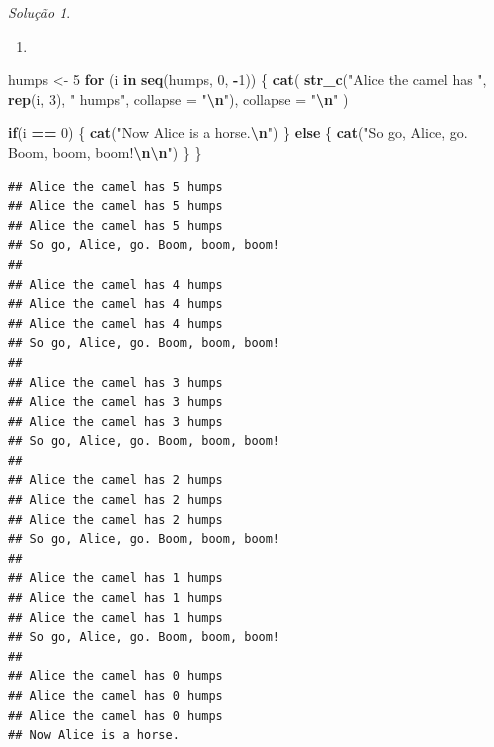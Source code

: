\documentclass[
]{latex/krantz}
\newenvironment{Shaded}{\begin{snugshade}}{\end{snugshade}}
\newcommand{\AttributeTok}[1]{\textcolor[rgb]{0.13,0.29,0.53}{#1}}
\newcommand{\ControlFlowTok}[1]{\textcolor[rgb]{0.13,0.29,0.53}{\textbf{#1}}}
\newcommand{\DecValTok}[1]{\textcolor[rgb]{0.00,0.00,0.81}{#1}}
\newcommand{\FunctionTok}[1]{\textcolor[rgb]{0.13,0.29,0.53}{\textbf{#1}}}
\newcommand{\NormalTok}[1]{#1}
\newcommand{\OtherTok}[1]{\textcolor[rgb]{0.56,0.35,0.01}{#1}}
\newcommand{\SpecialCharTok}[1]{\textcolor[rgb]{0.81,0.36,0.00}{\textbf{#1}}}
\newcommand{\StringTok}[1]{\textcolor[rgb]{0.31,0.60,0.02}{#1}}
\providecommand{\tightlist}{%
  \setlength{\itemsep}{0pt}\setlength{\parskip}{0pt}}
\theoremstyle{definition}
\theoremstyle{definition}
\theoremstyle{definition}
\theoremstyle{definition}
\theoremstyle{remark}
\newtheorem*{solution}{Solução}
\begin{document}
\begin{solution}
\leavevmode

\begin{enumerate}
\def\labelenumi{\alph{enumi}.}
\tightlist
\item
\end{enumerate}

\begin{Shaded}
\begin{Highlighting}[]
\NormalTok{humps }\OtherTok{\textless{}{-}} \DecValTok{5}
\ControlFlowTok{for}\NormalTok{ (i }\ControlFlowTok{in} \FunctionTok{seq}\NormalTok{(humps, }\DecValTok{0}\NormalTok{, }\SpecialCharTok{{-}}\DecValTok{1}\NormalTok{)) \{}
  \FunctionTok{cat}\NormalTok{(}
    \FunctionTok{str\_c}\NormalTok{(}\StringTok{"Alice the camel has "}\NormalTok{, }\FunctionTok{rep}\NormalTok{(i, }\DecValTok{3}\NormalTok{), }\StringTok{" humps"}\NormalTok{, }\AttributeTok{collapse =} \StringTok{"}\SpecialCharTok{\textbackslash{}n}\StringTok{"}\NormalTok{), }
    \AttributeTok{collapse =} \StringTok{"}\SpecialCharTok{\textbackslash{}n}\StringTok{"}
\NormalTok{  )}
  
  \ControlFlowTok{if}\NormalTok{(i }\SpecialCharTok{==} \DecValTok{0}\NormalTok{) \{}
    \FunctionTok{cat}\NormalTok{(}\StringTok{"Now Alice is a horse.}\SpecialCharTok{\textbackslash{}n}\StringTok{"}\NormalTok{)}
\NormalTok{  \} }\ControlFlowTok{else}\NormalTok{ \{}
    \FunctionTok{cat}\NormalTok{(}\StringTok{"So go, Alice, go. Boom, boom, boom!}\SpecialCharTok{\textbackslash{}n\textbackslash{}n}\StringTok{"}\NormalTok{)}
\NormalTok{  \}}
\NormalTok{\}}
\end{Highlighting}
\end{Shaded}

\begin{verbatim}
## Alice the camel has 5 humps
## Alice the camel has 5 humps
## Alice the camel has 5 humps 
## So go, Alice, go. Boom, boom, boom!
## 
## Alice the camel has 4 humps
## Alice the camel has 4 humps
## Alice the camel has 4 humps 
## So go, Alice, go. Boom, boom, boom!
## 
## Alice the camel has 3 humps
## Alice the camel has 3 humps
## Alice the camel has 3 humps 
## So go, Alice, go. Boom, boom, boom!
## 
## Alice the camel has 2 humps
## Alice the camel has 2 humps
## Alice the camel has 2 humps 
## So go, Alice, go. Boom, boom, boom!
## 
## Alice the camel has 1 humps
## Alice the camel has 1 humps
## Alice the camel has 1 humps 
## So go, Alice, go. Boom, boom, boom!
## 
## Alice the camel has 0 humps
## Alice the camel has 0 humps
## Alice the camel has 0 humps 
## Now Alice is a horse.
\end{verbatim}


\end{solution}
\end{document}
